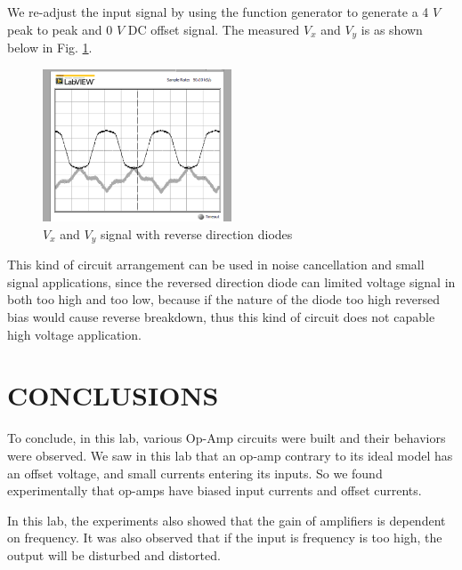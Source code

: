 \documentclass[letterpaper, 10 pt, conference]{ieeeconf}  %
\begin{document}
\par We re-adjust the input signal by using the function generator to generate a
4 $V$ peak to peak and 0 $V$ DC offset signal. The measured $V_{x}$ and $V_{y}$
is as shown below in Fig. \ref{fig:6.4}.
\begin{figure}[ht]
  \centering
  \includegraphics[width=0.5\textwidth]{images/6_4.png}
  \caption{$V_{x}$ and $V_{y}$ signal with reverse direction diodes}
  \label{fig:6.4}
\end{figure}
\par This kind of circuit arrangement can be used in noise cancellation and
small signal applications, since the reversed direction diode can limited voltage
signal in both too high and too low, because if the nature of the diode too high
reversed bias would cause reverse breakdown, thus this kind of circuit does not
capable high voltage application.
\section{CONCLUSIONS}
\par To conclude, in this lab, various Op-Amp circuits were built and their behaviors were observed.
We saw in this lab that an op-amp contrary to its ideal model has an offset voltage,
and small currents entering its inputs. So we found experimentally that op-amps have biased input currents and offset currents.
\par In this lab, the experiments also showed that the gain of amplifiers is dependent on frequency. It was also observed that if the input is frequency is too high, the output will be disturbed and distorted.

\end{document}
